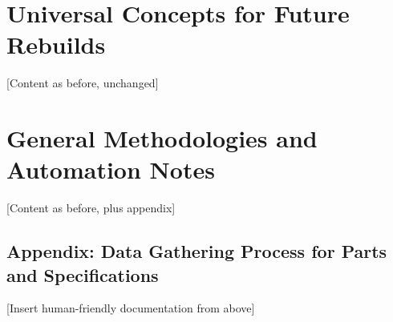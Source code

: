 \documentclass[a4paper,12pt]{article}
\begin{document}
\section{Universal Concepts for Future Rebuilds}\label{sec:universal}
[Content as before, unchanged]

\section{General Methodologies and Automation Notes}\label{sec:methodologies}
[Content as before, plus appendix]

\subsection{Appendix: Data Gathering Process for Parts and Specifications}
[Insert human-friendly documentation from above]
\end{document}
